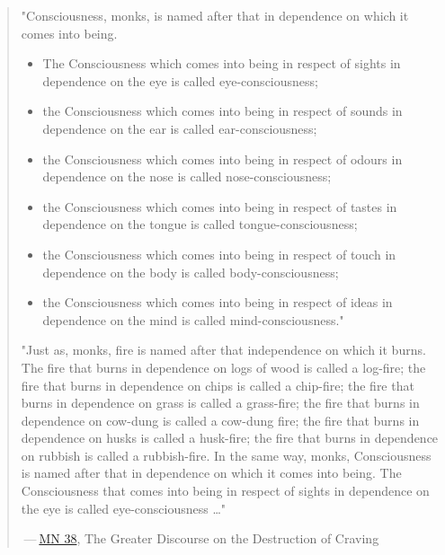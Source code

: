 \begin{quotation}
"Consciousness, monks, is named after that in dependence on which it
comes into being.


\begin{itemize}

\item The Consciousness which comes into being in respect of sights in dependence on the eye is called eye-consciousness;

\item the Consciousness which comes into being in respect of sounds in dependence on the ear is called ear-consciousness;

\item the Consciousness which comes into being in respect of odours in dependence on the nose is called nose-consciousness;

\item the Consciousness which comes into being in respect of tastes in dependence on the tongue is called tongue-consciousness;

\item the Consciousness which comes into being in respect of touch in dependence on the body is called body-consciousness;

\item the Consciousness which comes into being in respect of ideas in dependence on the mind is called mind-consciousness."

\end{itemize}


"Just as, monks, fire is named after that independence on which it
burns. The fire that burns in dependence on logs of wood is called a
log-fire; the fire that burns in dependence on chips is called a
chip-fire; the fire that burns in dependence on grass is called a
grass-fire; the fire that burns in dependence on cow-dung is called a
cow-dung fire; the fire that burns in dependence on husks is called a
husk-fire; the fire that burns in dependence on rubbish is called a
rubbish-fire. In the same way, monks, Consciousness is named after that
in dependence on which it comes into being. The Consciousness that comes
into being in respect of sights in dependence on the eye is called
eye-consciousness …"


 — \href{https://suttacentral.net/mn38/en/bodhi}{MN 38}, The Greater Discourse on the Destruction of Craving


\end{quotation}

